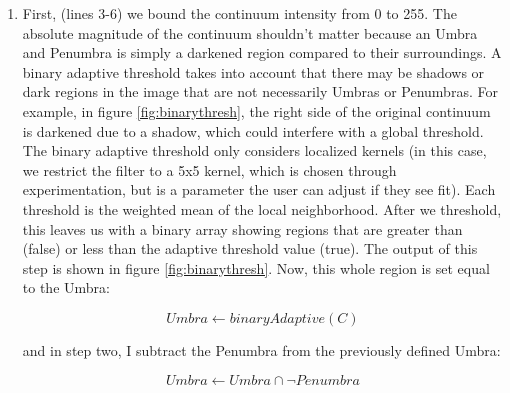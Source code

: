 \documentclass[defaultstyle,11pt]{thesis}
\begin{document}
\begin{enumerate}
    \item First, (lines 3-6) we bound the continuum intensity from 0 to 255. The absolute magnitude of the continuum shouldn't matter because an Umbra and Penumbra is simply a darkened region compared to their surroundings. A binary adaptive threshold \cite{scikit} takes into account that there may be shadows or dark regions in the image that are not necessarily Umbras or Penumbras. For example, in figure \ref{fig:binarythresh}, the right side of the original continuum is darkened due to a shadow, which could interfere with a global threshold. The binary adaptive threshold only considers localized kernels (in this case, we restrict the filter to a 5x5 kernel, which is chosen through experimentation, but is a parameter the user can adjust if they see fit). Each threshold is the weighted mean of the local neighborhood. After we threshold, this leaves us with a binary array showing regions that are greater than (false) or less than the adaptive threshold value (true). The output of this step is shown in figure \ref{fig:binarythresh}. Now, this whole region is set equal to the Umbra:
    
    $$Umbra \gets binaryAdaptive(C)$$
    
    and in step two, I subtract the Penumbra from the previously defined Umbra:
    
    $$Umbra \gets Umbra \cap \neg Penumbra$$
    

\end{enumerate}
\end{document}
